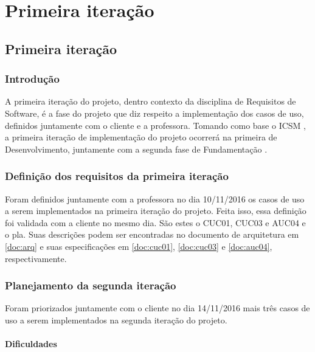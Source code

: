 \part{Primeira iteração}
\chapter[Primeira iteração]{Primeira iteração}

\section{Introdução}

A primeira iteração do projeto, dentro contexto da disciplina de Requisitos de Software, é a fase do projeto que diz respeito a implementação dos casos de uso, definidos juntamente com o cliente e a professora. Tomando como base o ICSM \cite{boehmincremental}, a primeira iteração de implementação do projeto ocorrerá na primeira de Desenvolvimento, juntamente com a segunda fase de Fundamentação \cite{boehmincremental}.

\section{Definição dos requisitos da primeira iteração}

Foram definidos juntamente com a professora no dia 10/11/2016 os casos de uso a serem implementados na primeira iteração do projeto. Feita isso, essa definição foi validada com a cliente no mesmo dia. São estes o CUC01, CUC03 e AUC04 e o pla. Suas descrições podem ser encontradas no documento de arquitetura em \ref{doc:arq} e suas especificações em \ref{doc:cuc01}, \ref{doc:cuc03} e \ref{doc:auc04}, respectivamente.

\section{Planejamento da segunda iteração}

Foram priorizados juntamente com o cliente no dia 14/11/2016 mais três casos de uso a serem implementados na segunda iteração do projeto. 

\subsection{Dificuldades}

